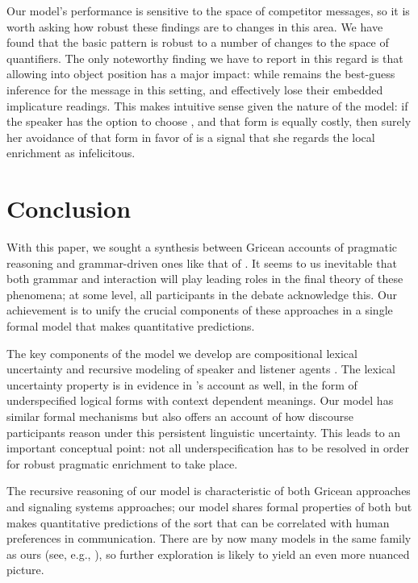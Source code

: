 \documentclass[leqno,12pt]{article}
\begin{document}
Our model's performance is sensitive to the space of competitor
messages, so it is worth asking how robust these findings are to
changes in this area. We have found that the basic pattern is robust
to a number of changes to the space of quantifiers.  The only
noteworthy finding we have to report in this regard is that allowing
 into object position has a major impact: while
 remains the best-guess inference for the message
 in this setting,  and
 effectively lose their embedded implicature
readings.  This makes intuitive sense given the nature of the model:
if the speaker has the option to choose , and that form is equally costly, then surely her avoidance
of that form in favor of  is a signal that she
regards the local enrichment as infelicitous.


\section{Conclusion}\label{sec:conclusion}

With this paper, we sought a synthesis between Gricean accounts of
pragmatic reasoning and grammar-driven ones like that of
\citet{ChierchiaFoxSpector08}. It seems to us inevitable that both
grammar and interaction will play leading roles in the final theory of
these phenomena; at some level, all participants in the debate
acknowledge this. Our achievement is to unify the crucial components
of these approaches in a single formal model that makes quantitative
predictions.

The key components of the model we develop are compositional lexical
uncertainty and recursive modeling of speaker and listener agents
\citep{Bergen:Levy:Goodman:2014}. The lexical uncertainty property is
in evidence in \citeauthor{ChierchiaFoxSpector08}'s account as well,
in the form of underspecified logical forms with context dependent
meanings. Our model has similar formal mechanisms but also offers an
account of how discourse participants reason under this persistent
linguistic uncertainty. This leads to an important conceptual point:
not all underspecification has to be resolved in order for robust
pragmatic enrichment to take place.

The recursive reasoning of our model is characteristic of both Gricean
approaches and signaling systems approaches; our model shares formal
properties of both but makes quantitative predictions of the sort that
can be correlated with human preferences in communication. There are
by now many models in the same family as ours (see, e.g.,
\citealt{CamererHo:2004,Jaeger:2011,Smith:Goodman:Frank:2013,Kao-etal:2014,Jaeger:Franke:2014}),
so further exploration is likely to yield an even more nuanced
picture.
\end{document}
